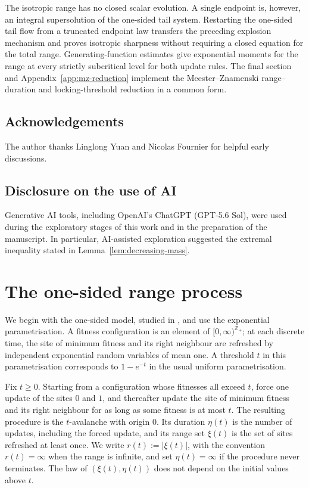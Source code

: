 \documentclass[11pt,a4paper]{amsart}
\theoremstyle{remark}
\newcommand{\Z}{\mathbb Z}
\begin{document}
The isotropic range has no closed scalar evolution. A single endpoint is,
however, an integral supersolution of the one-sided tail system. Restarting
the one-sided tail flow from a truncated endpoint law transfers the
preceding explosion mechanism and proves isotropic sharpness without
requiring a closed equation for the total range. Generating-function estimates give
exponential moments for the range at every strictly subcritical level for both
update rules. The final section and Appendix~\ref{app:mz-reduction} implement
the Meester--Znamenski range--duration and locking-threshold reduction in a
common form. 

\subsection*{Acknowledgements}
\leavevmode\par\noindent
The author thanks Linglong Yuan and Nicolas Fournier for helpful early
discussions.

\subsection*{Disclosure on the use of AI}
\leavevmode\par\noindent
Generative AI tools, including OpenAI's ChatGPT (GPT-5.6 Sol), were used during the exploratory stages of this work and in the preparation of the manuscript. In particular, AI-assisted exploration suggested the
extremal inequality stated in Lemma~\ref{lem:decreasing-mass}. 



\section{The one-sided range process}
\label{sec:avalanche-range}

We begin with the one-sided model, studied in \cite{MDRMZ98}, and use the exponential parametrisation. A fitness configuration is an element of $[0,\infty)^{\Z_+}$; at each discrete time, the site of minimum fitness and its right neighbour are refreshed by independent exponential random variables of mean one. A threshold $t$ in this parametrisation corresponds to $1-e^{-t}$ in the usual uniform parametrisation.

Fix $t\geq0$. Starting from a configuration whose fitnesses all exceed $t$, force one update of the sites $0$ and $1$, and thereafter update the site of minimum fitness and its right neighbour for as long as some fitness is at most $t$. The resulting procedure is the $t$-avalanche with origin $0$. Its duration $\eta(t)$ is the number of updates, including the forced update, and its range set $\xi(t)$ is the set of sites refreshed at least once. We write $r(t):=|\xi(t)|$, with the convention $r(t)=\infty$ when the range is infinite, and set $\eta(t)=\infty$ if the procedure never terminates. The law of $(\xi(t),\eta(t))$ does not depend on the initial values above $t$.
\end{document}
